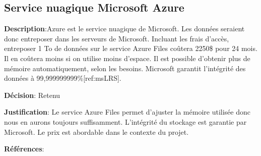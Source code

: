 

\subsection{Service nuagique Microsoft Azure}
\label{s:archiver_conc3}

\textbf{Description}:Azure est le service nuagique de Microsoft. Les données seraient donc entreposer dans les serveurs de Microsoft. Incluant les frais d’accès, entreposer 1 To de données sur le service Azure Files coûtera 2250\$ pour 24 mois. Il en coûtera moins si on utilise moins d’espace. Il est possible d’obtenir plus de mémoire automatiquement, selon les besoins. Microsoft garantit l’intégrité des données à 99,999999999\%[ref:msLRS].

\textbf{Décision}: Retenu 

\textbf{Justification}: Le service Azure Files permet d’ajuster la mémoire utilisée donc nous en aurons toujours suffisamment. L’intégrité du stockage est garantie par Microsoft. Le prix est abordable dans le contexte du projet.

\textbf{Références}: 
\cite{msAzFile, msRedunLRS}
